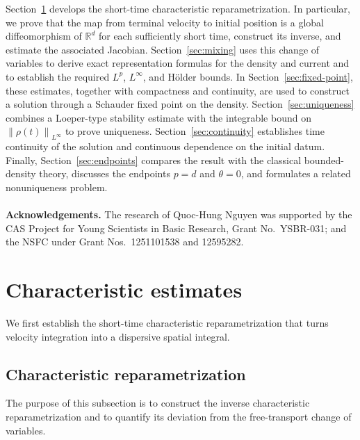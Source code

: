 \documentclass[11pt]{article}
\newcommand{\R}{\mathbb R}
\newcommand{\norm}[1]{\left\lVert #1\right\rVert}
\begin{document}
Section~\ref{sec:elliptic-flow} develops the short-time
characteristic reparametrization.  In particular, we prove that the map from
terminal velocity to initial position is a global diffeomorphism of $\R^d$
for each sufficiently short time, construct its inverse, and estimate the
associated Jacobian.  Section~\ref{sec:mixing}
uses this change of variables to derive exact representation formulas for
the density and current and to establish the required $L^p$, $L^\infty$,
and H\"older bounds.  In Section~\ref{sec:fixed-point}, these estimates,
together with compactness and continuity, are used to construct a solution
through a Schauder fixed point on the density.
Section~\ref{sec:uniqueness} combines a Loeper-type stability estimate with
the integrable bound on $\norm{\rho(t)}_{L^\infty}$ to prove uniqueness.
Section~\ref{sec:continuity} establishes time continuity of the solution and
continuous dependence on the initial datum.  Finally,
Section~\ref{sec:endpoints} compares the result with the classical
bounded-density theory, discusses the endpoints $p=d$ and $\theta=0$, and
formulates a related nonuniqueness problem.\\\\
{\bf Acknowledgements.} The research of Quoc-Hung Nguyen was supported by the 
CAS Project for Young Scientists in Basic Research, Grant No.~YSBR-031; and the NSFC under Grant Nos.~1251101538 and 12595282. 
\section{Characteristic estimates}\label{sec:elliptic-flow}

We first establish the short-time characteristic reparametrization that
turns velocity integration into a dispersive spatial integral.

\subsection{Characteristic reparametrization}

The purpose of this subsection is to construct the inverse
characteristic reparametrization and to quantify its deviation from the
free-transport change of variables.
\end{document}
